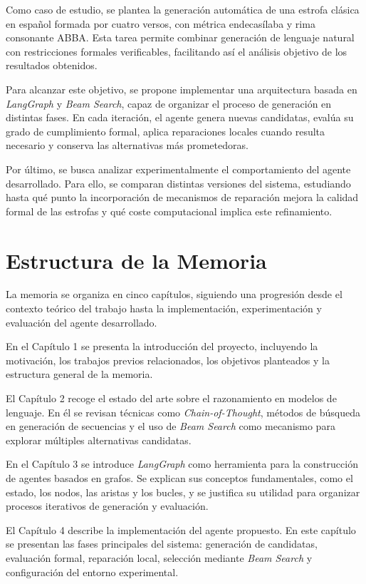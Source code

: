 \documentclass[12pt,a4paper,twoside,openright]{book}
\begin{document}
Como caso de estudio, se plantea la generación automática de una estrofa clásica en español formada por cuatro versos, con métrica endecasílaba y rima consonante ABBA.
Esta tarea permite combinar generación de lenguaje natural con restricciones formales verificables, facilitando así el análisis objetivo de los resultados obtenidos.

Para alcanzar este objetivo, se propone implementar una arquitectura basada en \emph{LangGraph} y \emph{Beam Search}, capaz de organizar el proceso de generación en distintas fases.
En cada iteración, el agente genera nuevas candidatas, evalúa su grado de cumplimiento formal, aplica reparaciones locales cuando resulta necesario y conserva las alternativas más prometedoras.

Por último, se busca analizar experimentalmente el comportamiento del agente desarrollado. Para ello, se comparan distintas versiones del sistema,
estudiando hasta qué punto la incorporación de mecanismos de reparación mejora la calidad formal de las estrofas y qué coste computacional implica este refinamiento.


\section{Estructura de la Memoria}

La memoria se organiza en cinco capítulos, siguiendo una progresión desde el contexto teórico del trabajo hasta la implementación, experimentación y evaluación del agente desarrollado.

En el Capítulo 1 se presenta la introducción del proyecto, incluyendo la motivación, los trabajos previos relacionados, los objetivos planteados y la estructura general de la memoria.

El Capítulo 2 recoge el estado del arte sobre el razonamiento en modelos de lenguaje.
En él se revisan técnicas como \emph{Chain-of-Thought}, métodos de búsqueda en generación de secuencias y el uso de \emph{Beam Search} como mecanismo para explorar múltiples alternativas candidatas.

En el Capítulo 3 se introduce \emph{LangGraph} como herramienta para la construcción de agentes basados en grafos.
Se explican sus conceptos fundamentales, como el estado, los nodos, las aristas y los bucles, y se justifica su utilidad para organizar procesos iterativos de generación y evaluación.

El Capítulo 4 describe la implementación del agente propuesto.
En este capítulo se presentan las fases principales del sistema: generación de candidatas, evaluación formal, reparación local, selección mediante \emph{Beam Search} y configuración del entorno experimental.
\end{document}
